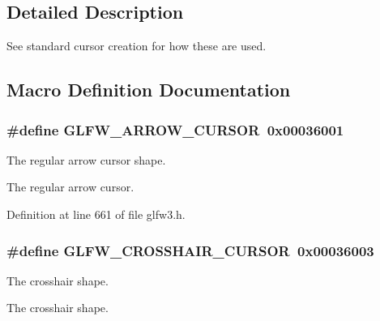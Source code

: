 \subsection{Detailed Description}
See standard cursor creation for how these are used. 

\subsection{Macro Definition Documentation}
\hypertarget{group__shapes_ga8ab0e717245b85506cb0eaefdea39d0a}{}
\subsubsection[{G\+L\+F\+W\+\_\+\+A\+R\+R\+O\+W\+\_\+\+C\+U\+R\+S\+O\+R}]{\setlength{\rightskip}{0pt plus 5cm}\#define G\+L\+F\+W\+\_\+\+A\+R\+R\+O\+W\+\_\+\+C\+U\+R\+S\+O\+R~0x00036001}\label{group__shapes_ga8ab0e717245b85506cb0eaefdea39d0a}


The regular arrow cursor shape. 

The regular arrow cursor. 

Definition at line 661 of file glfw3.\+h.

\hypertarget{group__shapes_ga8af88c0ea05ab9e8f9ac1530e8873c22}{}
\subsubsection[{G\+L\+F\+W\+\_\+\+C\+R\+O\+S\+S\+H\+A\+I\+R\+\_\+\+C\+U\+R\+S\+O\+R}]{\setlength{\rightskip}{0pt plus 5cm}\#define G\+L\+F\+W\+\_\+\+C\+R\+O\+S\+S\+H\+A\+I\+R\+\_\+\+C\+U\+R\+S\+O\+R~0x00036003}\label{group__shapes_ga8af88c0ea05ab9e8f9ac1530e8873c22}


The crosshair shape. 

The crosshair shape. 

